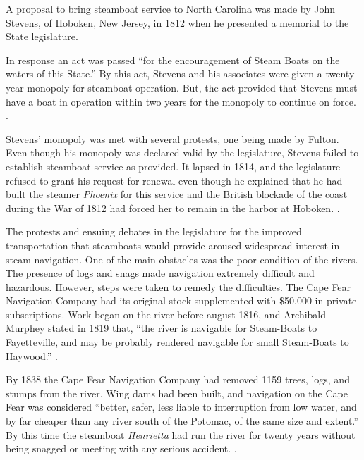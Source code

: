 \documentclass[11pt, a5paper, openright]{book}
\newcommand{\steamer}[1]{\textit{#1}\index{#1,~steamer}}
\begin{document}
A proposal to bring steamboat service to North Carolina was made by
John Stevens, of Hoboken, New Jersey, in 1812 when he presented a
memorial to the State legislature.\par

In response an act was passed ``for the encouragement of Steam Boats
on the waters of this State.''  By this act, Stevens and his
associates were given a twenty year monopoly for steamboat operation.
But, the act provided that Stevens must have a boat in operation
within two years for the monopoly to continue on force.
\citep[12]{sloanth}.\par

Stevens' monopoly was met with several protests, one being made by
Fulton.  Even though his monopoly was declared valid by the
legislature, Stevens failed to establish steamboat service as
provided.  It lapsed in 1814, and the legislature refused to grant his
request for renewal even though he explained that he had built the
steamer \textit{Phoenix} for this service and the British blockade of
the coast during the War of 1812 had forced her to remain in the
harbor at Hoboken.  \citep[1-3]{turlingtonsw}.\par

The protests and ensuing debates in the legislature for the improved
transportation that steamboats would provide aroused widespread
interest in steam navigation.  One of the main obstacles was the poor
condition of the rivers.  The presence of logs and snags made
navigation extremely difficult and hazardous.  However, steps were
taken to remedy the difficulties.  The Cape Fear Navigation Company
had its original stock supplemented with \$50,000 in private
subscriptions.  Work began on the river before august 1816, and
Archibald Murphey stated in 1819 that, ``the river is navigable for
Steam-Boats to Fayetteville, and may be probably rendered navigable
for small Steam-Boats to Haywood.''  \citep[7, 11]{turlingtonsw}.\par

By 1838 the Cape Fear Navigation Company had removed 1159 trees, logs,
and stumps from the river.  Wing dams had been built, and navigation
on the Cape Fear was considered ``better, safer, less liable to
interruption from low water, and by far cheaper than any river south
of the Potomac, of the same size and extent.''  By this time the
steamboat \steamer{Henrietta} had run the river for twenty years
without being snagged or meeting with any serious accident.
\citep[12, 13]{turlingtonsw}.\par
\end{document}
